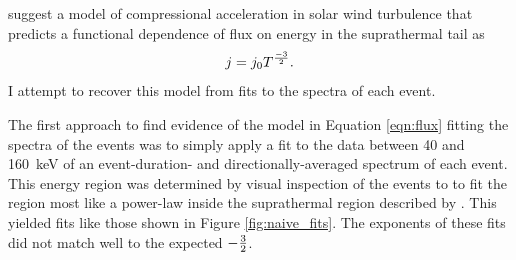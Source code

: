 \documentclass[letterpaper,11pt]{article}
\begin{document}
%

\citet{Fisk2006} suggest a model of compressional acceleration in solar wind turbulence that predicts a functional dependence of flux on energy in the suprathermal tail as
\begin{equation}
j = j_0 T^{-3 \over 2}.
\label{eqn:flux}
\end{equation}
I attempt to recover this model from fits to the spectra of each event.

The first approach to find evidence of the model in Equation \ref{eqn:flux} fitting the spectra of the events was to simply apply a fit to the data between 40 and \SI{160}{\kilo\electronvolt} of an event-duration- and directionally-averaged spectrum of each event.  This energy region was determined by visual inspection of the events to to fit the region most like a power-law inside the suprathermal region described by \citet{Fisk2008}. This yielded fits like those shown in Figure \ref{fig:naive_fits}.  The exponents of these fits did not match well to the expected $-{3 \over 2}$.
\end{document}
